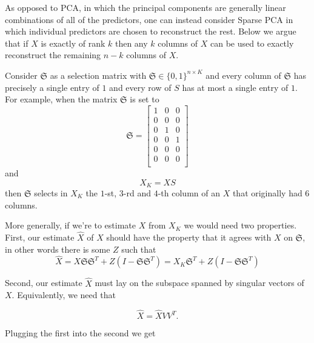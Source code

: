 \documentclass[conference]{IEEEtran}
\begin{document}
As opposed to PCA, in which the principal components are generally linear combinations of all of the predictors, one can instead consider Sparse PCA \cite{htf01} in which individual predictors are chosen to reconstruct the rest. Below we argue that  if $X$ is exactly of rank $k$ then any $k$ columns of $X$ can be used to exactly reconstruct the remaining $n-k$ columns of $X$.

Consider $\mathfrak{S}$ as a selection matrix with $\mathfrak{S} \in \{0,1\}^{n \times K}$ and every column of $\mathfrak{S}$ has precisely a single entry of $1$ and every row of $S$ has at most a single entry of $1$.
For example, when the matrix $\mathfrak{S}$ is set to
$$
\mathfrak{S} = 
\begin{bmatrix}
1 & 0 & 0 \\
0 & 0 & 0 \\
0 & 1 & 0 \\
0 & 0 & 1 \\
0 & 0 & 0 \\
0 & 0 & 0 \\
\end{bmatrix}
$$
\noindent
and
$$X_K = X S$$
\noindent
then $\mathfrak{S}$  selects in $X_K$ the $1$-st, $3$-rd and $4$-th column of an $X$ that originally had $6$ columns.


More generally, if we're to estimate $X$ from $X_K$ we would need two properties.
First, our estimate $\hat{X}$ of $X$ should have the property that it agrees with $X$ on $\mathfrak{S}$, in other words there is some $Z$ such that
$$
\hat{X} = X \mathfrak{S} \mathfrak{S}^T + Z (I-\mathfrak{S} \mathfrak{S}^T) = X_K \mathfrak{S}^T + Z (I-\mathfrak{S} \mathfrak{S}^T)
$$

Second, our estimate $\hat{X}$ must lay on the subspace spanned by singular vectors of $X$.  Equivalently, we need that

$$
\hat{X} = \hat{X} V V^T.
$$

Plugging the first into the second we get
\end{document}
